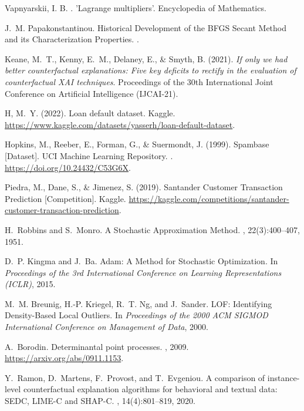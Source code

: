 \documentclass[12pt]{extarticle}
\numberwithin{equation}{section}
\begin{document}
\begin{thebibliography}{99}
Vapnyarskii, I. B. 
.
\newblock 'Lagrange multipliers'. Encyclopedia of Mathematics.

J.~M. Papakonstantinou.
\newblock Historical Development of the BFGS Secant Method and its Characterization Properties.
.

Keane, M.~T., Kenny, E.~M., Delaney, E., \& Smyth, B. (2021).
\newblock \textit{If only we had better counterfactual explanations:
Five key deficits to rectify in the evaluation of counterfactual XAI techniques}.
Proceedings of the 30th International Joint Conference on Artificial
Intelligence (IJCAI-21).

\newblock H, M.~Y. (2022). Loan default dataset. Kaggle. 
\newblock \url{https://www.kaggle.com/datasets/yasserh/loan-default-dataset}.

\newblock Hopkins, M., Reeber, E., Forman, G., \& Suermondt, J. (1999). Spambase [Dataset]. UCI Machine Learning Repository. .
\newblock \url{https://doi.org/10.24432/C53G6X}.

\newblock Piedra, M., Dane, S., \& Jimenez, S. (2019). Santander Customer Transaction Prediction [Competition]. Kaggle.
\newblock \url{https://kaggle.com/competitions/santander-customer-transaction-prediction}.

H.~Robbins and S.~Monro.
\newblock A Stochastic Approximation Method.
, 22(3):400--407, 1951.

D.~P. Kingma and J.~Ba.
\newblock Adam: A Method for Stochastic Optimization.
\newblock In {\em Proceedings of the 3rd International Conference on Learning Representations (ICLR)}, 2015.

M.~M. Breunig, H.-P. Kriegel, R.~T. Ng, and J.~Sander.
\newblock LOF: Identifying Density-Based Local Outliers.
\newblock In {\em Proceedings of the 2000 ACM SIGMOD International Conference on Management of Data}, 2000.

A.~Borodin.
\newblock Determinantal point processes.
, 2009.
\newblock \url{https://arxiv.org/abs/0911.1153}.

Y.~Ramon, D.~Martens, F.~Provost, and T.~Evgeniou.
\newblock A comparison of instance-level counterfactual explanation algorithms for behavioral and textual data: SEDC, LIME-C and SHAP-C.
, 14(4):801--819, 2020.


\end{thebibliography}
\end{document}
